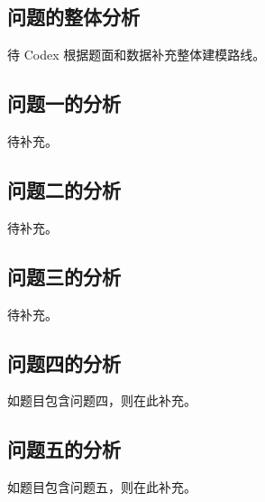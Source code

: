 \subsection{问题的整体分析}\label{sub:2.1}

待 Codex 根据题面和数据补充整体建模路线。

\subsection{问题一的分析}\label{sub:2.2}

待补充。

\subsection{问题二的分析}\label{sub:2.3}

待补充。

\subsection{问题三的分析}\label{sub:2.4}

待补充。

\subsection{问题四的分析}\label{sub:2.5}

如题目包含问题四，则在此补充。

\subsection{问题五的分析}\label{sub:2.6}

如题目包含问题五，则在此补充。
